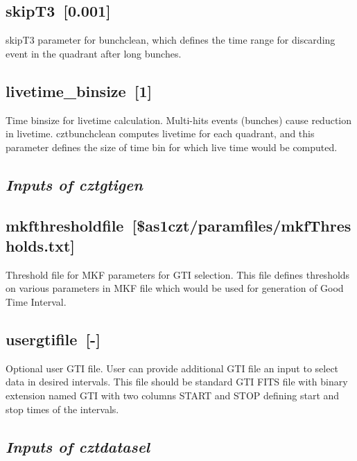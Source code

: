\documentclass[11pt,oneside,a4paper]{article}
\begin{document}
\subsection*{skipT3~[0.001]}
    skipT3 parameter for bunchclean, which defines the time range for 
discarding event in the quadrant after long bunches.
\subsection*{livetime\_binsize~[1]}
    Time binsize for livetime calculation. Multi-hits events (bunches) cause reduction in 
livetime. cztbunchclean computes livetime for each quadrant, and this parameter defines 
the size of time bin for which live time would be computed. 
 

\subsection*{\emph{Inputs of cztgtigen}}

\subsection*{mkfthresholdfile~[\$as1czt/paramfiles/mkfThresholds.txt]}
    Threshold file for MKF parameters for GTI selection. This file defines 
thresholds on various parameters in MKF file which would be used for 
generation of Good Time Interval.
\subsection*{usergtifile~[-]}
    Optional user GTI file. User can provide additional GTI file an input 
to select data in desired intervals. This file should be standard GTI FITS 
file with binary extension named GTI with two columns START and STOP defining 
start and stop times of the intervals.


\subsection*{\emph{Inputs of cztdatasel}}
\end{document}
